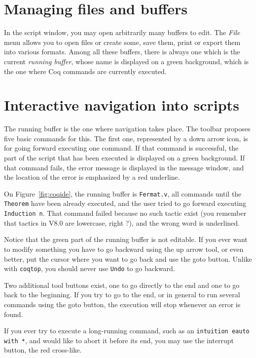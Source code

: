 \section{Managing files and buffers}

In the script window, you may open arbitrarily many buffers to
edit. The \emph{File} menu allows you to open files or create some,
save them, print or export them into various formats. Among all these
buffers, there is always one which is the current \emph{running
  buffer}, whose name is displayed on a green background, which is the
one where Coq commands are currently executed. 

\section{Interactive navigation into \Coq{} scripts}

The running buffer is the one where navigation takes place. The
toolbar proposes five basic commands for this. The first one,
represented by a down arrow icon, is for going forward executing one
command. If that command is successful, the part of the script that
has been executed is displayed on a green background. If that command
fails, the error message is displayed in the message window, and the
location of the error is emphasized by a red underline.

On Figure~\ref{fig:coqide}, the running buffer is \verb|Fermat.v|, all
commands until the \verb|Theorem| have been already executed, and the
user tried to go forward executing \verb|Induction n|. That command
failed because no such tactic exist (you remember that tactics in V8.0
are lowercase, right ?), and the wrong word is underlined.

Notice that the green part of the running buffer is not editable. If
you ever want to modify something you have to go backward using the up
arrow tool, or even better, put the cursor where you want to go back
and use the \textsf{goto} button. Unlike with \verb|coqtop|, you
should never use \verb|Undo| to go backward.

Two additional tool buttons exist, one to go directly to the end and
one to go back to the beginning. If you try to go to the end, or in
general to run several commands using the \textsf{goto} button, the
  execution will stop whenever an error is found.

If you ever try to execute a long-running command, such as an
\verb|intuition eauto with *|, and would like to abort it before its
end, you may use the interrupt button, the red cross-like.
 
